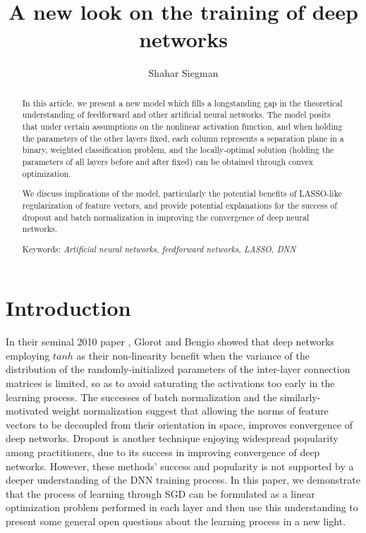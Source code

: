 \documentclass[]{article}
\title{A new look on the training of deep networks}
\author{Shahar Siegman}
\begin{document}
 	
 	\maketitle
 	
 	\begin{abstract}
 		In this article, we present a new model which fills a longstanding gap in the theoretical understanding of feedforward and other artificial neural networks. The model posits that under certain assumptions on the nonlinear activation function, and when holding the parameters of the other layers fixed, each column represents a separation plane in a binary, weighted classification problem, and the locally-optimal solution (holding the parameters of all layers before and after fixed) can be obtained through convex optimization. 
 		
 		We discuss implications of the model, particularly the potential benefits of LASSO-like regularization of feature vectors, and provide potential explanations for the success of dropout \cite{Dropout:1} and batch normalization \cite{Batch:3} in improving the convergence of deep neural networks.
 		
 		Keywords: \textit{Artificial neural networks, feedforward networks, LASSO, DNN}
 	\end{abstract}
 	
 	\section{Introduction}
 		In their seminal 2010 paper \cite{Glorot:2}, Glorot and Bengio showed that deep networks employing $tanh$ as their non-linearity benefit when the variance of the distribution of the randomly-initialized parameters of the inter-layer connection matrices is limited, so as to avoid saturating the activations too early in the learning process. The successes of batch normalization \cite{Batch:3} and the similarly-motivated weight normalization \cite{Weightnorm:4} suggest that allowing the norms of feature vectors to be decoupled from their orientation in space, improves convergence of deep networks. Dropout \cite{Dropout:1} is another technique enjoying widespread popularity among practitioners, due to its success in improving convergence of deep networks. However, these methods' success and popularity is not supported by a deeper understanding of the DNN training process. 
 		In this paper, we demonstrate that the process of learning through SGD can be formulated as a linear optimization problem performed in each layer and then use this understanding to present some general open questions about the learning process in a new light.
 		 
\end{document}
